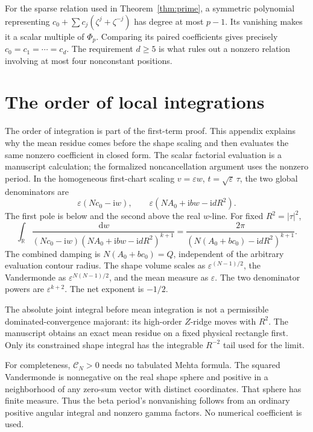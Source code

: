 \documentclass[11pt]{article}
\numberwithin{equation}{section}
\theoremstyle{definition}
\newcommand{\dd}{\,\mathrm d}
\newcommand{\ii}{\mathrm i}
\newcommand{\R}{\mathbb R}
\newcommand{\eps}{\varepsilon}
\begin{document}
For the sparse relation used in Theorem~\ref{thm:prime}, a symmetric
polynomial representing \(c_0+\sum c_j(\zeta^j+\zeta^{-j})\) has
degree at most \(p-1\). Its vanishing makes it a scalar multiple
of \(\Phi_p\). Comparing its paired coefficients gives precisely
\(c_0=c_1=\cdots=c_d\). The requirement \(d\ge5\) is what rules
out a nonzero relation involving at most four nonconstant positions.



\section{The order of local integrations}\label{app:local}

The order of integration is part of the first-term proof. This appendix
explains why the mean residue comes before the shape scaling and then
evaluates the same nonzero coefficient in closed form. The scalar
factorial evaluation is a manuscript calculation; the formalized
noncancellation argument uses the nonzero period.
In the homogeneous first-chart scaling \(v=\eps w\),
\(t=\sqrt\eps\,\tau\), the two global denominators are
\[
 \eps(Nc_0-\ii w),\qquad
 \eps(NA_0+\ii bw-\ii dR^2).
\]
The first pole is below and the second above the real \(w\)-line.
For fixed \(R^2=|\tau|^2\),
\[
 \int_\R
 \frac{\dd w}{(Nc_0-\ii w)(NA_0+\ii bw-\ii dR^2)^{k+1}}
 =\frac{2\pi}{(N(A_0+bc_0)-\ii dR^2)^{k+1}}.
\]
The combined damping is \(N(A_0+bc_0)=Q\), independent of the arbitrary
evaluation contour radius. The shape volume scales as
\(\eps^{(N-1)/2}\), the Vandermonde as
\(\eps^{N(N-1)/2}\), and the mean measure as \(\eps\).
The two denominator powers are \(\eps^{k+2}\).
The net exponent is \(-1/2\).

The absolute joint integral before mean integration is not a permissible
dominated-convergence majorant: its high-order \(Z\)-ridge moves with
\(R^2\). The manuscript obtains an exact mean residue on a fixed physical
rectangle first. Only its constrained shape integral has the integrable
\(R^{-2}\) tail used for the limit.

For completeness, \(\mathscr C_N>0\) needs no tabulated Mehta formula.
The squared Vandermonde is nonnegative on the real shape sphere and
positive in a neighborhood of any zero-sum vector with distinct
coordinates. That sphere has finite measure. Thus the beta period's
nonvanishing follows from an ordinary positive angular integral and
nonzero gamma factors. No numerical coefficient is used.
\end{document}
